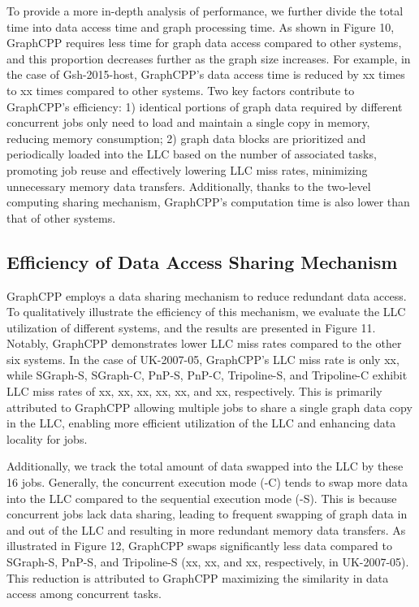 \documentclass[lettersize,journal]{IEEEtran} %
\begin{document}
To provide a more in-depth analysis of performance, we further divide the total time into data access time and graph processing time. As shown in Figure 10, GraphCPP requires less time for graph data access compared to other systems, and this proportion decreases further as the graph size increases. For example, in the case of Gsh-2015-host, GraphCPP's data access time is reduced by xx times to xx times compared to other systems. Two key factors contribute to GraphCPP's efficiency: 1) identical portions of graph data required by different concurrent jobs only need to load and maintain a single copy in memory, reducing memory consumption; 2) graph data blocks are prioritized and periodically loaded into the LLC based on the number of associated tasks, promoting job reuse and effectively lowering LLC miss rates, minimizing unnecessary memory data transfers. Additionally, thanks to the two-level computing sharing mechanism, GraphCPP's computation time is also lower than that of other systems.

\subsection{Efficiency of Data Access Sharing Mechanism}
GraphCPP employs a data sharing mechanism to reduce redundant data access. To qualitatively illustrate the efficiency of this mechanism, we evaluate the LLC utilization of different systems, and the results are presented in Figure 11. Notably, GraphCPP demonstrates lower LLC miss rates compared to the other six systems. In the case of UK-2007-05, GraphCPP's LLC miss rate is only xx, while SGraph-S, SGraph-C, PnP-S, PnP-C, Tripoline-S, and Tripoline-C exhibit LLC miss rates of xx, xx, xx, xx, xx, and xx, respectively. This is primarily attributed to GraphCPP allowing multiple jobs to share a single graph data copy in the LLC, enabling more efficient utilization of the LLC and enhancing data locality for jobs.

Additionally, we track the total amount of data swapped into the LLC by these 16 jobs. Generally, the concurrent execution mode (-C) tends to swap more data into the LLC compared to the sequential execution mode (-S). This is because concurrent jobs lack data sharing, leading to frequent swapping of graph data in and out of the LLC and resulting in more redundant memory data transfers. As illustrated in Figure 12, GraphCPP swaps significantly less data compared to SGraph-S, PnP-S, and Tripoline-S (xx, xx, and xx, respectively, in UK-2007-05). This reduction is attributed to GraphCPP maximizing the similarity in data access among concurrent tasks.
\end{document}
